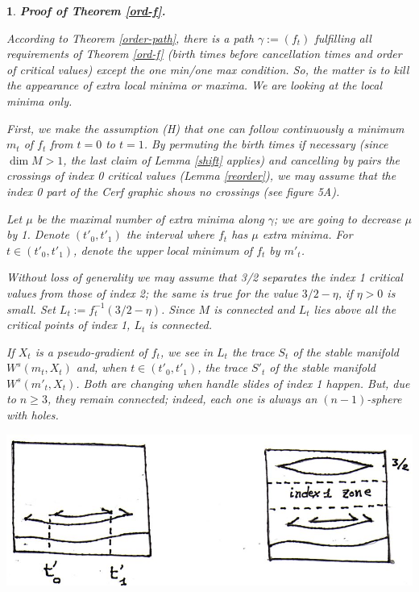 \documentclass[12pt]{amsart}
\newtheorem{rien}[thm]{}
\def\ga{\gamma}
\begin{document}
 \begin{rien}{\bf Proof of Theorem \ref{ord-f}.} {\rm According to Theorem \ref{order-path}, there is a
 path $\ga:= \left(f_t\right)$  fulfilling all requirements of Theorem \ref{ord-f} (birth times before cancellation times and order of critical values) except the one min/one max condition. So, the matter is to kill the appearance of extra local minima or maxima.
 We are  looking at the local minima only. %
 
First, we make the assumption (H) that  one can follow continuously a minimum $m_t$ of $f_t$ from $t=0$
 to $t=1$. 
 By permuting the birth times if necessary (since $\dim M>1$,  the last claim  of Lemma \ref{shift} applies) and 
 cancelling by pairs the crossings of index 0 critical 
 values (Lemma \ref{reorder}), we may assume that the index 0 part of the Cerf
 graphic shows no crossings (see figure 5A). 
 
 Let $\mu$ be the 
 maximal number of extra minima along $\ga$; we are going to decrease $\mu$ by 1. 
 Denote $(t'_0,t'_1)$ the interval  where $f_t$ has $\mu$ extra minima.
 For $t\in (t'_0,t'_1)$, denote  the upper local minimum of $f_t$ by $m'_t$.
 
 Without loss of generality we may assume that 3/2 separates the index 1 critical values from those of index 2; the same is true for the value $3/2-\eta$, if $\eta>0$ is small. %
 Set
 $L_t:=f^{-1}_t(3/2-\eta)$.
  Since $M$ is connected and  $L_t$ lies above all the critical points of index 1, $L_t$
 is connected.
 
  If $X_t$
 is a pseudo-gradient of $f_t$, we see  in $L_t$ the trace $S_t$ of the stable manifold
 $W^s(m_t,X_t)$ and, when $t\in (t'_0,t'_1)$, the trace $S'_t$ of the stable manifold
 $W^s (m'_t,X_t)$. Both are changing when  handle slides of index 1 happen. But, due to 
 $n\geq 3$, they remain connected; indeed,  each one is always an $(n-1)$-sphere with holes. 
 
  \begin{center}
  \parbox[t]{15cm}{
 \hspace{4cm}\includegraphics*[scale=0.5]{reidemeister4-083.jpg}
 
}
\end{center}}
\end{rien}
\end{document}
